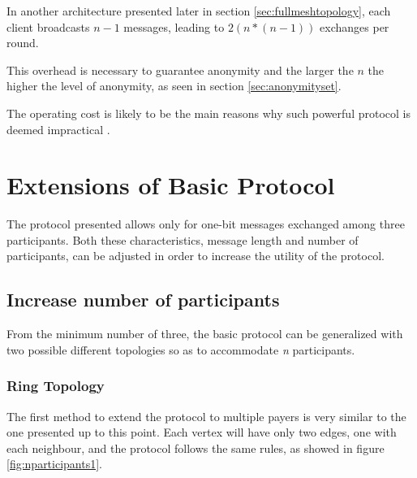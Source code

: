 In another architecture presented later in section \ref{sec:fullmeshtopology}, each client broadcasts $n-1$ messages, leading to $2(n * (n - 1))$ exchanges per round.

This overhead is necessary to guarantee anonymity and the larger the $n$ the higher the level of anonymity, as seen in section \ref{sec:anonymityset}. 

The operating cost is likely to be the main reasons why such powerful protocol is deemed impractical \cite{Scholz}.


\section{Extensions of Basic Protocol}
The protocol presented allows only for one-bit messages exchanged among three participants. Both these characteristics, message length and number of participants, can be adjusted in order to increase the utility of the protocol. 

\subsection{Increase number of participants} \label{sec:participantsextention}
From the minimum number of three, the basic protocol can be generalized with two possible different topologies so as to accommodate \textit{n} participants.

\subsubsection{Ring Topology} \label{sec:ringtopology}
The first method to extend the protocol to multiple payers is very similar to the one presented up to this point. Each vertex will have only two edges, one with each neighbour, and the protocol follows the same rules, as showed in figure \ref{fig:nparticipants1}.

